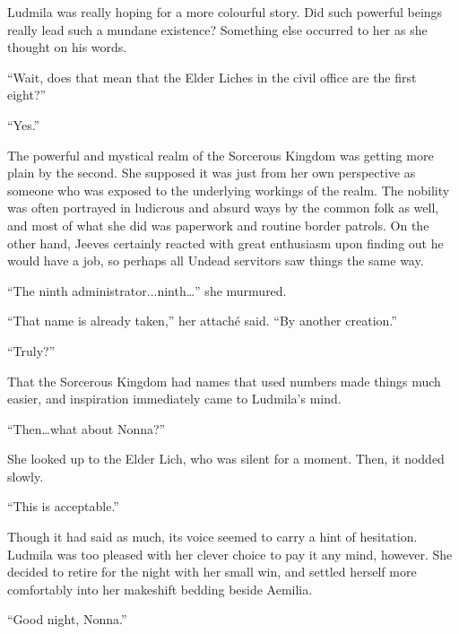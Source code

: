  

Ludmila was really hoping for a more colourful story. Did such powerful beings really lead such a mundane existence? Something else occurred to her as she thought on his words.

 

“Wait, does that mean that the Elder Liches in the civil office are the first eight?”

 

“Yes.”

 

The powerful and mystical realm of the Sorcerous Kingdom was getting more plain by the second. She supposed it was just from her own perspective as someone who was exposed to the underlying workings of the realm. The nobility was often portrayed in ludicrous and absurd ways by the common folk as well, and most of what she did was paperwork and routine border patrols. On the other hand, Jeeves certainly reacted with great enthusiasm upon finding out he would have a job, so perhaps all Undead servitors saw things the same way.

 

“The ninth administrator...ninth…” she murmured.

 

“That name is already taken,” her attaché said. “By another creation.”

 

“Truly?”

 

That the Sorcerous Kingdom had names that used numbers made things much easier, and inspiration immediately came to Ludmila’s mind.

 

“Then…what about Nonna?”

 

She looked up to the Elder Lich, who was silent for a moment. Then, it nodded slowly.

 

“This is acceptable.”

 

Though it had said as much, its voice seemed to carry a hint of hesitation. Ludmila was too pleased with her clever choice to pay it any mind, however. She decided to retire for the night with her small win, and settled herself more comfortably into her makeshift bedding beside Aemilia.

 

“Good night, Nonna.”

 

